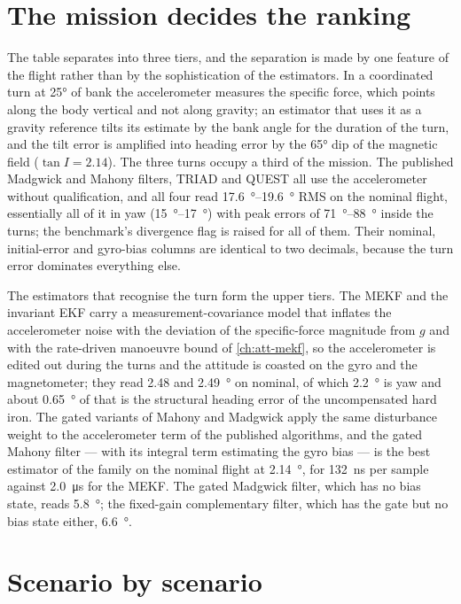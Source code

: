 \section{The mission decides the ranking}

The table separates into three tiers, and the separation is made by one feature of the flight
rather than by the sophistication of the estimators. In a coordinated turn at \ang{25} of bank
the accelerometer measures the specific force, which points along the body vertical and not
along gravity; an estimator that uses it as a gravity reference tilts its estimate by the bank
angle for the duration of the turn, and the tilt error is amplified into heading error by the
\ang{65} dip of the magnetic field ($\tan I = 2.14$). The three turns occupy a third of the
mission. The published Madgwick and Mahony filters, TRIAD and QUEST all use the accelerometer
without qualification, and all four read \SIrange{17.6}{19.6}{\degree} RMS on the nominal
flight, essentially all of it in yaw (\SIrange{15}{17}{\degree}) with peak errors of
\SIrange{71}{88}{\degree} inside the turns; the benchmark's divergence flag is raised for all of
them. Their nominal, initial-error and gyro-bias columns are identical to two decimals, because
the turn error dominates everything else.

The estimators that recognise the turn form the upper tiers. The MEKF and the invariant EKF
carry a measurement-covariance model that inflates the accelerometer noise with the deviation of
the specific-force magnitude from $g$ and with the rate-driven manoeuvre bound of
\cref{ch:att-mekf}, so the accelerometer is edited out during the turns and the attitude is
coasted on the gyro and the magnetometer; they read \num{2.48} and \SI{2.49}{\degree} on
nominal, of which \SI{2.2}{\degree} is yaw and about \SI{0.65}{\degree} of that is the structural
heading error of the uncompensated hard iron. The gated variants of Mahony and Madgwick apply
the same disturbance weight to the accelerometer term of the published algorithms, and the
gated Mahony filter --- with its integral term estimating the gyro bias --- is the best
estimator of the family on the nominal flight at \SI{2.14}{\degree}, for \SI{132}{\nano\second}
per sample against \SI{2.0}{\micro\second} for the MEKF. The gated Madgwick filter, which has no
bias state, reads \SI{5.8}{\degree}; the fixed-gain complementary filter, which has the gate but
no bias state either, \SI{6.6}{\degree}.

\section{Scenario by scenario}

